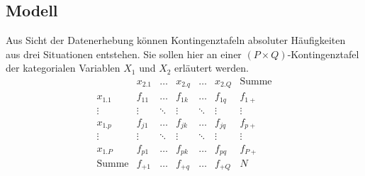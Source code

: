 \subsection{Modell}
\label{sec:loglinModel}

Aus Sicht der Datenerhebung können Kontingenztafeln absoluter Häufigkeiten aus drei Situationen entstehen. Sie sollen hier an einer $(P \times Q)$-Kontingenztafel der kategorialen Variablen $X_{1}$ und $X_{2}$ erläutert werden.
\begin{equation*}
\begin{array}{r|ccccc|l}
~        & x_{2.1} & \ldots & x_{2.q} & \ldots & x_{2.Q} & \text{Summe} \\\hline
x_{1.1}  & f_{11}  & \ldots & f_{1k}  & \ldots & f_{1q}  & f_{1+} \\
\vdots   & \vdots  & \ddots & \vdots  & \ddots & \vdots  & \vdots \\
x_{1.p}  & f_{j1}  & \ldots & f_{jk}  & \ldots & f_{jq}  & f_{p+} \\
\vdots   & \vdots  & \ddots & \vdots  & \ddots & \vdots  & \vdots \\
x_{1.P}  & f_{p1}  & \ldots & f_{pk}  & \ldots & f_{pq}  & f_{P+} \\\hline
\text{Summe} & f_{+1} & \ldots & f_{+q} & \ldots & f_{+Q} & N
\end{array}
\end{equation*}

